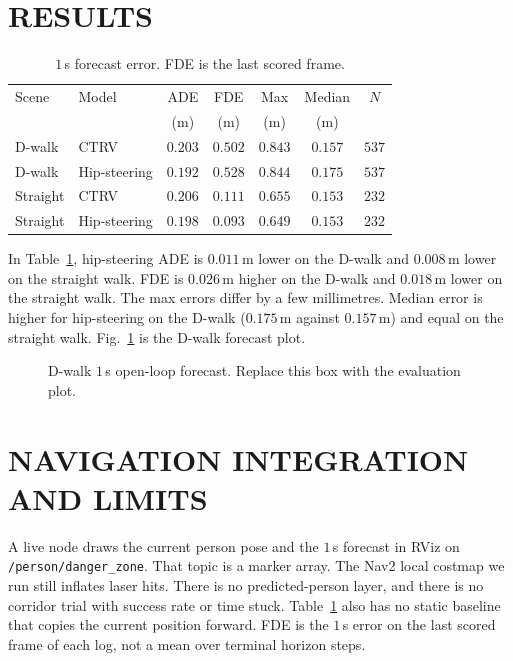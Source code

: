 \documentclass[letterpaper, 10pt, conference]{IEEEtran}
\begin{document}
\section{RESULTS}

\begin{table}[t]
\centering
\caption{$1$\,s forecast error. FDE is the last scored frame.}
\label{tab:1s}
\begin{tabular}{llccccc}
\toprule
Scene & Model & ADE & FDE & Max & Median & $N$ \\
 & & (m) & (m) & (m) & (m) & \\
\midrule
D-walk & CTRV & $0.203$ & $0.502$ & $0.843$ & $0.157$ & $537$ \\
D-walk & Hip-steering & $0.192$ & $0.528$ & $0.844$ & $0.175$ & $537$ \\
Straight & CTRV & $0.206$ & $0.111$ & $0.655$ & $0.153$ & $232$ \\
Straight & Hip-steering & $0.198$ & $0.093$ & $0.649$ & $0.153$ & $232$ \\
\bottomrule
\end{tabular}
\end{table}

In Table~\ref{tab:1s}, hip-steering ADE is $0.011$\,m
lower on the D-walk and $0.008$\,m lower on the straight walk. FDE is
$0.026$\,m higher on the D-walk and $0.018$\,m lower on the straight walk.
The max errors differ by a few millimetres. Median error is higher for
hip-steering on the D-walk ($0.175$\,m against $0.157$\,m) and equal on the
straight walk. Fig.~\ref{fig:dwalk} is the D-walk forecast plot.

\begin{figure}[t]
\centering
{}
\caption{D-walk $1$\,s open-loop forecast. Replace this box with the
evaluation plot.}
\label{fig:dwalk}
\end{figure}

\section{NAVIGATION INTEGRATION AND LIMITS}

A live node draws the current person pose and the $1$\,s forecast in RViz
on \texttt{/person/danger\_zone}. That topic is a marker array. The Nav2
local costmap we run still inflates laser hits. There is no predicted-person
layer, and there is no corridor trial with success rate or time stuck.
Table~\ref{tab:1s} also has no static baseline that copies the current
position forward. FDE is the $1$\,s error on the last scored frame of each
log, not a mean over terminal horizon steps.
\end{document}
